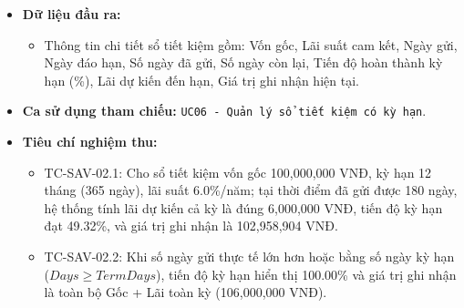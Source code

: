 \documentclass[11pt,a4paper]{article}
\providecommand{\tightlist}{
  \setlength{\itemsep}{0pt}\setlength{\parskip}{0pt}}
\begin{document}
\begin{itemize}
\begin{itemize}
    \begin{itemize}
    \tightlist
    \item
      Tiến độ kỳ hạn:
      \(Process = \min\left(1.0, \frac{Days}{TermDays}\right)\).
    \item
      Lãi dự kiến toàn kỳ:
      \(ExpectedInterest = \frac{Principal \times Rate \times TermDays}{365}\).
    \item
      Giá trị sổ ghi nhận tại thời điểm quan sát:
      \[Balance = Principal + (ExpectedInterest \times Process)\]
    \item
      Số ngày còn lại đến đáo hạn:
      \(RemainingDays = \max(0, TermDays - Days)\).
    \end{itemize}
  \item
    Sử dụng \texttt{BigDecimal} với scale trung gian tối thiểu là 4 chữ
    số thập phân và chỉ định \texttt{RoundingMode.HALF\_EVEN} cho các
    phép chia.
  \end{itemize}
\item
  \textbf{Dữ liệu đầu ra:}

  \begin{itemize}
  \tightlist
  \item
    Thông tin chi tiết sổ tiết kiệm gồm: Vốn gốc, Lãi suất cam kết, Ngày
    gửi, Ngày đáo hạn, Số ngày đã gửi, Số ngày còn lại, Tiến độ hoàn
    thành kỳ hạn (\%), Lãi dự kiến đến hạn, Giá trị ghi nhận hiện tại.
  \end{itemize}
\item
  \textbf{Ca sử dụng tham chiếu:}
  \texttt{UC06\ -\ Quản\ lý\ sổ\ tiết\ kiệm\ có\ kỳ\ hạn}.
\item
  \textbf{Tiêu chí nghiệm thu:}

  \begin{itemize}
  \tightlist
  \item
    TC-SAV-02.1: Cho sổ tiết kiệm vốn gốc 100,000,000 VNĐ, kỳ hạn 12
    tháng (365 ngày), lãi suất 6.0\%/năm; tại thời điểm đã gửi được 180
    ngày, hệ thống tính lãi dự kiến cả kỳ là đúng 6,000,000 VNĐ, tiến độ
    kỳ hạn đạt 49.32\%, và giá trị ghi nhận là 102,958,904 VNĐ.
  \item
    TC-SAV-02.2: Khi số ngày gửi thực tế lớn hơn hoặc bằng số ngày kỳ
    hạn (\(Days \ge TermDays\)), tiến độ kỳ hạn hiển thị 100.00\% và giá
    trị ghi nhận là toàn bộ Gốc + Lãi toàn kỳ (106,000,000 VNĐ).
  \end{itemize}
\end{itemize}

\newpage
\end{document}

